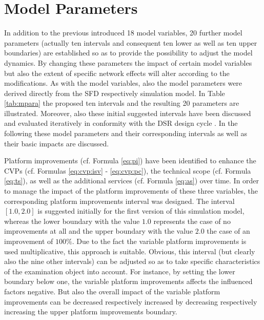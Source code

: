 \section{Model Parameters}\label{ch:sfd:mp}

In addition to the previous introduced 18 model variables, 20 further model parameters (actually ten intervals and consequent ten lower as well as ten upper boundaries) are established so as to provide the possibility to adjust the model dynamics. By changing these parameters the impact of certain model variables but also the extent of specific network effects will alter according to the modifications. As with the model variables, also the model parameters were derived directly from the \ac{SFD} respectively simulation model. In Table \ref{tab:mpara} the proposed ten intervals and the resulting 20 parameters are illustrated. Moreover, also these initial suggested intervals have been discussed and evaluated iteratively in conformity with the \ac{DSR} design cycle \citep{Hevner2007}. In the following these model parameters and their corresponding intervals as well as their basic impacts are discussed.

Platform improvements (cf. Formula \ref{eq:pi}) have been identified to enhance the \acp{CVP} (cf. Formulas \ref{eq:cvp:isv} - \ref{eq:cvp:pc}), the technical scope (cf. Formula \ref{eq:ts}), as well as the additional services (cf. Formula \ref{eq:as}) over time. In order to manage the impact of the platform improvements of these three variables, the corresponding platform improvements interval was designed. The interval $[1.0,2.0]$ is suggested initially for the first version of this simulation model, whereas the lower boundary with the value $1.0$ represents the case of no improvements at all and the upper boundary with the value $2.0$ the case of an improvement of $100\%$. Due to the fact the variable platform improvements is used multiplicative, this approach is suitable. Obvious, this interval (but clearly also the nine other intervals) can be adjusted so as to take specific characteristics of the examination object into account. For instance, by setting the lower boundary below one, the variable platform improvements affects the influenced factors negative. But also the overall impact of the variable platform improvements can be decreased respectively increased by decreasing respectively increasing the upper platform improvements boundary.

